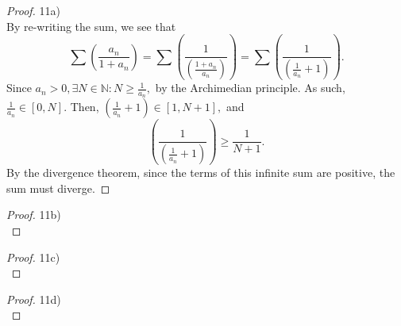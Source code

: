 \documentclass[10pt]{article}
\theoremstyle{definition}
\theoremstyle{plain}
\newcommand{\N}{\mathbb{N}}
\begin{document}
\begin{proof}
11a) \\

By re-writing the sum, we see that
$$\sum \left(\frac{a_n}{1+ a_n}\right) = \sum\left(\frac{1}{(\frac{1+ a_n}{a_n})}\right) = \sum\left(\frac{1}{(\frac{1}{a_n}+ 1)}\right).$$
Since $a_n > 0, \exists N\in\N: N \geq \frac{1}{a_n},$ by the Archimedian principle. As such, $\frac{1}{a_n}\in [0,N].$ Then, $(\frac{1}{a_n}+1)\in [1,N+1],$ and $$\left(\frac{1}{(\frac{1}{a_n}+1)}\right)\geq \frac{1}{N+1}.$$
By the divergence theorem, since the terms of this infinite sum are positive, the sum must diverge.
\end{proof}


\begin{proof}
11b) \\

\end{proof}


\begin{proof}
11c) \\

\end{proof}


\begin{proof}
11d) \\

\end{proof}
\end{document}
